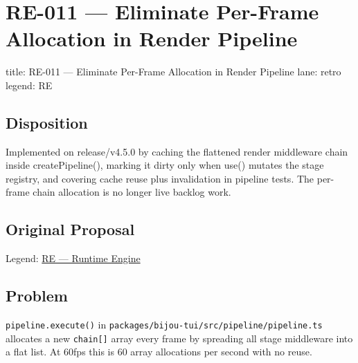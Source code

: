 \chapter{RE-011 --- Eliminate Per-Frame Allocation in Render Pipeline}\label{record-397}

\smallskip

\begin{RecordMeta}
title: RE-011 — Eliminate Per-Frame Allocation in Render Pipeline
lane: retro
legend: RE

\end{RecordMeta}

\section{Disposition}\label{record-397-disposition}

Implemented on release/v4.5.0 by caching the flattened render middleware chain inside createPipeline(), marking it dirty only when use() mutates the stage registry, and covering cache reuse plus invalidation in pipeline tests. The per-frame chain allocation is no longer live backlog work.

\section{Original Proposal}\label{record-397-original-proposal}

Legend: \href{https://github.com/flyingrobots/bijou/blob/1853ad902f6bf219326409e7f743a5a1d6517dbc/docs/method/legends/RE-runtime-engine.md}{RE --- Runtime Engine}

\section{Problem}\label{record-397-problem}

\texttt{p\allowbreak{}i\allowbreak{}p\allowbreak{}e\allowbreak{}l\allowbreak{}i\allowbreak{}n\allowbreak{}e\allowbreak{}.\allowbreak{}e\allowbreak{}x\allowbreak{}e\allowbreak{}c\allowbreak{}u\allowbreak{}t\allowbreak{}e\allowbreak{}(\allowbreak{})} in \texttt{p\allowbreak{}a\allowbreak{}c\allowbreak{}k\allowbreak{}a\allowbreak{}g\allowbreak{}e\allowbreak{}s\allowbreak{}/\allowbreak{}b\allowbreak{}i\allowbreak{}j\allowbreak{}o\allowbreak{}u\allowbreak{}-\allowbreak{}t\allowbreak{}u\allowbreak{}i\allowbreak{}/\allowbreak{}s\allowbreak{}r\allowbreak{}c\allowbreak{}/\allowbreak{}p\allowbreak{}i\allowbreak{}p\allowbreak{}e\allowbreak{}l\allowbreak{}i\allowbreak{}n\allowbreak{}e\allowbreak{}/\allowbreak{}p\allowbreak{}i\allowbreak{}p\allowbreak{}e\allowbreak{}l\allowbreak{}i\allowbreak{}n\allowbreak{}e\allowbreak{}.\allowbreak{}t\allowbreak{}s} allocates a new \texttt{c\allowbreak{}h\allowbreak{}a\allowbreak{}i\allowbreak{}n\allowbreak{}[\allowbreak{}]} array every frame by spreading all stage middleware into a flat list. At 60fps this is 60 array allocations per second with no reuse.

